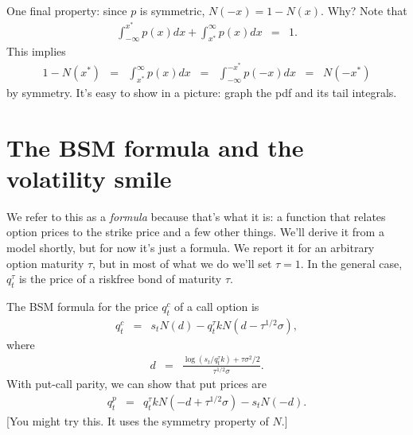\documentclass[11pt]{article}
\begin{document}
One final property:  since $p$ is symmetric, $N(-x) = 1 - N(x)$.
Why?
Note that
\begin{eqnarray*}
\int_{-\infty}^{x^*} p(x) dx + \int_{x^*}^{\infty} p(x) dx &=& 1 .
\end{eqnarray*}
This implies
\begin{eqnarray*}
     1 - N(x^*) &=& \int_{x^*}^{\infty} p(x) dx \;\;=\;\; \int_{-\infty}^{-x^*} p(-x) dx
            \;\;=\;\; N(-x^*)
\end{eqnarray*}
by symmetry.
It's easy to show in a picture:
graph the pdf and its tail integrals.


\section{The BSM formula and the volatility smile}


We refer to this as a {\it formula\/} because that's what it is:
a function that relates option prices to the strike price
and a few other things.  We'll derive it from a model shortly,
but for now it's just a formula.
We report it for an arbitrary option maturity $\tau$,
but in most of what we do we'll set $\tau = 1$.
In the general case, $q^\tau_t$ is the price of a riskfree bond
of maturity $\tau$.

The BSM formula for the price $q^c_t$ of a call option is
\begin{eqnarray}
        q^c_t &=& s_t N(d) - q^\tau_t k N (d - \tau^{1/2}\sigma ),
        \label{eq:bsm-call}
\end{eqnarray}
where
\begin{eqnarray*}
          d &=& \frac{\log(s_t/q^\tau_t k) + \tau \sigma^2/2}{\tau^{1/2}\sigma} .
\end{eqnarray*}
With put-call parity, we can show that put prices are
\begin{eqnarray}
        q^p_t &=& q^\tau_t k N(-d + \tau^{1/2} \sigma) - s_t N(-d) .
        \label{eq:bsm-put}
\end{eqnarray}
[You might try this. It uses the symmetry property of $N$.]
\end{document}
